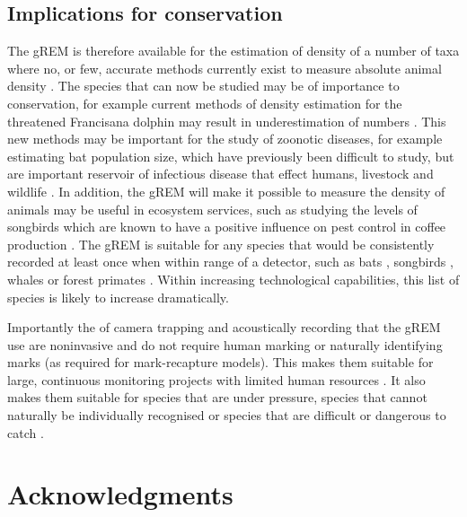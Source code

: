 \documentclass[a4paper,10pt,reqno,oneside]{amsart}
\begin{document}
\subsection*{Implications for conservation}
The gREM is therefore available for the estimation of density of a number of taxa where no, or few, accurate methods currently exist to measure absolute animal density \citep{thomas2012passive}. The species that can now be studied may be of importance to conservation, for example current methods of density estimation for the threatened Francisana dolphin may result in underestimation of numbers \citep{crespo2010abundance}. This new methods may be important for the study of zoonotic diseases, for example estimating bat population size, which have previously been difficult to study\citep{robinson1997home}, but are important reservoir of infectious disease that effect humans, livestock and wildlife \citep{calisher2006bats}. In addition, the gREM will make it possible to measure the density of animals may be useful in ecosystem services, such as studying the levels of songbirds which are known to have a positive influence on pest control in coffee production \citep{jirinec2011roosting}. The gREM is suitable for any species that would be consistently recorded at least once when within range of a detector, such as bats \citep{kunz2009methods}, songbirds \citep{buckland2006point}, whales \citep{marques2009estimating} or forest primates \citep{hassel2008reliable}. Within increasing technological capabilities, this list of species is likely to increase dramatically.

Importantly the of camera trapping and acoustically recording that the gREM use are noninvasive and do not require human marking  \citep{jewell2013effect} or naturally identifying marks (as required for mark-recapture models). This makes them suitable for large, continuous monitoring projects with limited human resources \citep{kelly2012noninvasive}. It also makes them suitable for species that are under pressure, species that cannot naturally be individually recognised or species that are difficult or dangerous to catch \citep{thomas2012passive}.


\section{Acknowledgments}



	
	
\end{document}
